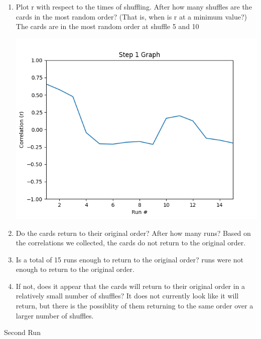 \documentclass[12pt]{article}
\begin{document}
    \begin{enumerate}
        \item Plot r with respect to the times of shuffling. After how many shuffles are the cards 
        in the most random order? (That is, when is r at a minimum value?)
        \subitem The cards are in the most random order at shuffle 5 and 10\\
        \begin{minipage}[t]{\linewidth}
            \centering
            {
              \includegraphics[width=.7\linewidth]{Figure_1.png}
            }
            \medskip       
        \end{minipage}
        \item Do the cards return to their original order?  After how many runs?
        \subitem Based on the correlations we collected, the cards do not return to the original order.
        \item Is a total of 15 runs enough to return to the original order?
         runs were not enough to return to the original order.
        \item If not, does it appear that the cards will return to their original order in a relatively 
        small number of shuffles?
        \subitem It does not currently look like it will return, 
                 but there is the possiblity of them returning to the same order over a larger number of shuffles.
    \end{enumerate}
    \newpage
    \begin{center}
        \small Second Run
    \end{center}
\end{document}
